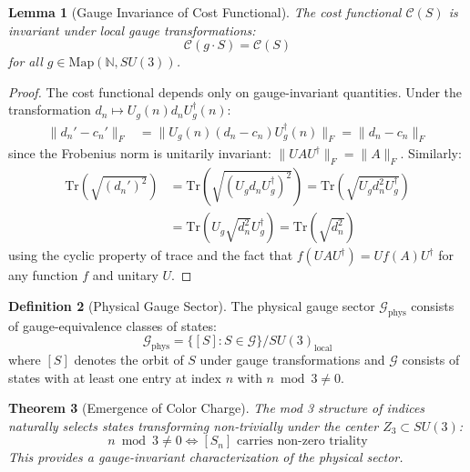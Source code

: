 \documentclass[11pt]{article}
\numberwithin{equation}{section}
\newtheorem{theorem}{Theorem}[section]
\newtheorem{lemma}[theorem]{Lemma}
\theoremstyle{definition}
\newtheorem{definition}[theorem]{Definition}
\theoremstyle{remark}
\begin{document}
\begin{lemma}[Gauge Invariance of Cost Functional]
The cost functional $\mathcal{C}(S)$ is invariant under local gauge transformations:
\begin{equation}
\mathcal{C}(g \cdot S) = \mathcal{C}(S)
\end{equation}
for all $g \in \text{Map}(\mathbb{N}, SU(3))$.
\end{lemma}

\begin{proof}
The cost functional depends only on gauge-invariant quantities. Under the transformation $d_n \mapsto U_g(n) d_n U_g^\dagger(n)$:
\begin{align}
\|d_n' - c_n'\|_F &= \|U_g(n)(d_n - c_n)U_g^\dagger(n)\|_F = \|d_n - c_n\|_F
\end{align}
since the Frobenius norm is unitarily invariant: $\|UAU^\dagger\|_F = \|A\|_F$. Similarly:
\begin{align}
\text{Tr}(\sqrt{(d_n')^2}) &= \text{Tr}(\sqrt{(U_g d_n U_g^\dagger)^2}) = \text{Tr}(\sqrt{U_g d_n^2 U_g^\dagger}) \\
&= \text{Tr}(U_g \sqrt{d_n^2} U_g^\dagger) = \text{Tr}(\sqrt{d_n^2})
\end{align}
using the cyclic property of trace and the fact that $f(UAU^\dagger) = Uf(A)U^\dagger$ for any function $f$ and unitary $U$.
\end{proof}

\begin{definition}[Physical Gauge Sector]
The physical gauge sector $\mathcal{G}_{\text{phys}}$ consists of gauge-equivalence classes of states:
\begin{equation}
\mathcal{G}_{\text{phys}} = \{[S] : S \in \mathcal{G}\} / SU(3)_{\text{local}}
\end{equation}
where $[S]$ denotes the orbit of $S$ under gauge transformations and $\mathcal{G}$ consists of states with at least one entry at index $n$ with $n \bmod 3 \neq 0$.
\end{definition}

\begin{theorem}[Emergence of Color Charge]
The mod 3 structure of indices naturally selects states transforming non-trivially under the center $Z_3 \subset SU(3)$:
\begin{equation}
n \bmod 3 \neq 0 \iff [S_n] \text{ carries non-zero triality}
\end{equation}
This provides a gauge-invariant characterization of the physical sector.
\end{theorem}
\end{document}
